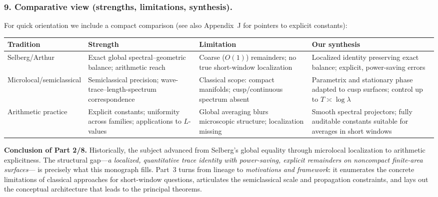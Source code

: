 \medskip

\subsubsection*{9. Comparative view (strengths, limitations, synthesis).}
For quick orientation we include a compact comparison (see also Appendix~J for pointers to explicit constants):
\begin{center}
\renewcommand{\arraystretch}{1.2}
\begin{tabular}{|p{3.1cm}|p{5.2cm}|p{5.2cm}|p{5.2cm}|}
\hline
\textbf{Tradition} & \textbf{Strength} & \textbf{Limitation} & \textbf{Our synthesis} \\
\hline
Selberg/Arthur \cite{Selberg1956,ArthurBook}
& Exact global spectral–geometric balance; arithmetic reach
& Coarse ($O(1)$) remainders; no true short-window localization
& Localized identity preserving exact balance; explicit, power-saving errors \\
\hline
Microlocal/semiclassical \cite{DG1975,Colin1978,Ivrii1980}
& Semiclassical precision; wave-trace–length-spectrum correspondence
& Classical scope: compact manifolds; cusp/continuous spectrum absent
& Parametrix and stationary phase adapted to cusp surfaces; control up to $T\asymp\log\lambda$ \\
\hline
Arithmetic practice \cite{Iwaniec2002,LuoSarnak1995,MichelVenkatesh2010}
& Explicit constants; uniformity across families; applications to $L$-values
& Global averaging blurs microscopic structure; localization missing
& Smooth spectral projectors; fully auditable constants suitable for averages in short windows \\
\hline
\end{tabular}
\end{center}

\medskip

\noindent\textbf{Conclusion of Part 2/8.}
Historically, the subject advanced from Selberg’s global equality through microlocal
localization to arithmetic explicitness.
The structural gap—\emph{a localized, quantitative trace identity with power-saving, explicit remainders on noncompact finite-area surfaces}—
is precisely what this monograph fills.
Part~3 turns from lineage to \emph{motivations and framework}:
it enumerates the concrete limitations of classical approaches for short-window questions,
articulates the semiclassical scale and propagation constraints,
and lays out the conceptual architecture that leads to the principal theorems.

